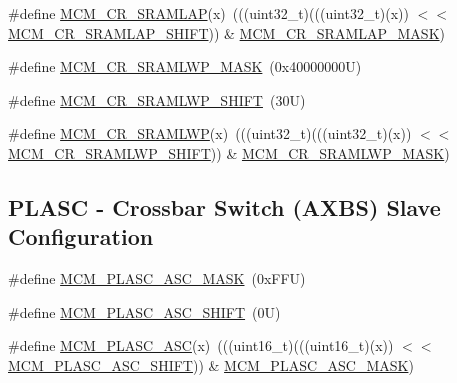 \begin{DoxyCompactItemize}
\item 
\#define \mbox{\hyperlink{group___d_m_a___register___masks_ga016e1c55cc89e6f0db47095d5c710f06}{M\+C\+M\+\_\+\+C\+R\+\_\+\+S\+R\+A\+M\+L\+AP}}(x)~(((uint32\+\_\+t)(((uint32\+\_\+t)(x)) $<$$<$ \mbox{\hyperlink{group___d_m_a___register___masks_ga083d0b4e4188e656d92bfa8fb9b4eca9}{M\+C\+M\+\_\+\+C\+R\+\_\+\+S\+R\+A\+M\+L\+A\+P\+\_\+\+S\+H\+I\+FT}})) \& \mbox{\hyperlink{group___d_m_a___register___masks_gad9a5f5487e03cefac1a4798ccce630bc}{M\+C\+M\+\_\+\+C\+R\+\_\+\+S\+R\+A\+M\+L\+A\+P\+\_\+\+M\+A\+SK}})
\item 
\#define \mbox{\hyperlink{group___d_m_a___register___masks_ga93830e2785e77585febe87f0bc83da5c}{M\+C\+M\+\_\+\+C\+R\+\_\+\+S\+R\+A\+M\+L\+W\+P\+\_\+\+M\+A\+SK}}~(0x40000000\+U)
\item 
\#define \mbox{\hyperlink{group___d_m_a___register___masks_ga7c3a04f9ed4a8824e212536c1d783fea}{M\+C\+M\+\_\+\+C\+R\+\_\+\+S\+R\+A\+M\+L\+W\+P\+\_\+\+S\+H\+I\+FT}}~(30\+U)
\item 
\#define \mbox{\hyperlink{group___d_m_a___register___masks_gac78c1a3d491b02420c7dab408a3d7675}{M\+C\+M\+\_\+\+C\+R\+\_\+\+S\+R\+A\+M\+L\+WP}}(x)~(((uint32\+\_\+t)(((uint32\+\_\+t)(x)) $<$$<$ \mbox{\hyperlink{group___d_m_a___register___masks_ga7c3a04f9ed4a8824e212536c1d783fea}{M\+C\+M\+\_\+\+C\+R\+\_\+\+S\+R\+A\+M\+L\+W\+P\+\_\+\+S\+H\+I\+FT}})) \& \mbox{\hyperlink{group___d_m_a___register___masks_ga93830e2785e77585febe87f0bc83da5c}{M\+C\+M\+\_\+\+C\+R\+\_\+\+S\+R\+A\+M\+L\+W\+P\+\_\+\+M\+A\+SK}})
\end{DoxyCompactItemize}
\subsection*{P\+L\+A\+SC -\/ Crossbar Switch (A\+X\+BS) Slave Configuration}
\begin{DoxyCompactItemize}
\item 
\#define \mbox{\hyperlink{group___m_c_m___register___masks_ga215cf860c41174735020a34e7ccf9590}{M\+C\+M\+\_\+\+P\+L\+A\+S\+C\+\_\+\+A\+S\+C\+\_\+\+M\+A\+SK}}~(0x\+F\+F\+U)
\item 
\#define \mbox{\hyperlink{group___m_c_m___register___masks_ga88f833168fd51e1b3c950e21b00bbfc3}{M\+C\+M\+\_\+\+P\+L\+A\+S\+C\+\_\+\+A\+S\+C\+\_\+\+S\+H\+I\+FT}}~(0\+U)
\item 
\#define \mbox{\hyperlink{group___m_c_m___register___masks_gaaae648a9e1b6e2e44af89bb3a6881a54}{M\+C\+M\+\_\+\+P\+L\+A\+S\+C\+\_\+\+A\+SC}}(x)~(((uint16\+\_\+t)(((uint16\+\_\+t)(x)) $<$$<$ \mbox{\hyperlink{group___m_c_m___register___masks_ga88f833168fd51e1b3c950e21b00bbfc3}{M\+C\+M\+\_\+\+P\+L\+A\+S\+C\+\_\+\+A\+S\+C\+\_\+\+S\+H\+I\+FT}})) \& \mbox{\hyperlink{group___m_c_m___register___masks_ga215cf860c41174735020a34e7ccf9590}{M\+C\+M\+\_\+\+P\+L\+A\+S\+C\+\_\+\+A\+S\+C\+\_\+\+M\+A\+SK}})
\end{DoxyCompactItemize}
